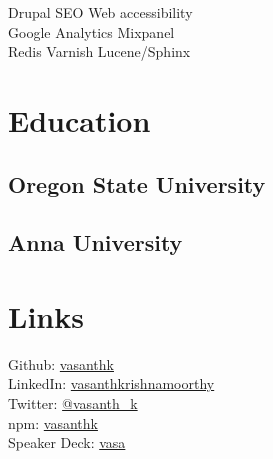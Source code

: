 \documentclass[]{my-resume-openfont}
\begin{document}
\begin{minipage}[t]{0.33\textwidth}
Drupal \textbullet{} SEO \textbullet{} Web accessibility \\
Google Analytics \textbullet{} Mixpanel \\
Redis \textbullet{} Varnish \textbullet{}  Lucene/Sphinx \\
\sectionsep


\section{Education} 

\subsection{Oregon State University}
\sectionsep

\subsection{Anna University}
\sectionsep


\section{Links} 
Github: \href{https://github.com/vasanthk}{vasanthk} \\
LinkedIn: \href{https://www.linkedin.com/in/vasanthkrishnamoorthy}{vasanthkrishnamoorthy} \\
Twitter: \href{https://twitter.com/vasanth_k}{@vasanth\_k} \\
npm: \href{https://www.npmjs.com/~vasanthk}{vasanthk} \\
Speaker Deck: \href{https://speakerdeck.com/vasa}{vasa}
\sectionsep

%
%

\end{minipage} 
\hfill
\end{document}
